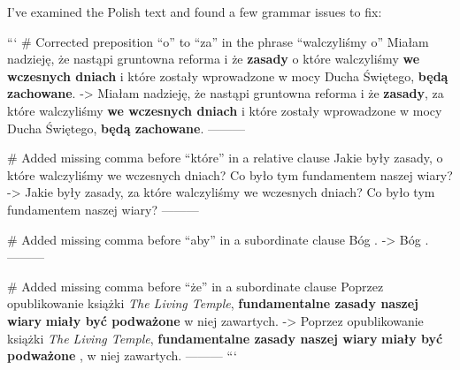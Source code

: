 I've examined the Polish text and found a few grammar issues to fix:

```
# Corrected preposition “o” to “za” in the phrase “walczyliśmy o”
Miałam nadzieję, że nastąpi gruntowna reforma i że \textbf{zasady} o które walczyliśmy \textbf{we wczesnych dniach} i które zostały wprowadzone w mocy Ducha Świętego, \textbf{będą zachowane}.
->
Miałam nadzieję, że nastąpi gruntowna reforma i że \textbf{zasady}, za które walczyliśmy \textbf{we wczesnych dniach} i które zostały wprowadzone w mocy Ducha Świętego, \textbf{będą zachowane}.
---------

# Added missing comma before “które” in a relative clause
Jakie były zasady, o które walczyliśmy we wczesnych dniach? Co było tym fundamentem naszej wiary?
->
Jakie były zasady, za które walczyliśmy we wczesnych dniach? Co było tym fundamentem naszej wiary?
---------

# Added missing comma before “aby” in a subordinate clause
Bóg .
->
Bóg .
---------

# Added missing comma before “że” in a subordinate clause
Poprzez opublikowanie książki \textit{The Living Temple}, \textbf{fundamentalne zasady naszej wiary} \textbf{miały być podważone}  w niej zawartych.
->
Poprzez opublikowanie książki \textit{The Living Temple}, \textbf{fundamentalne zasady naszej wiary} \textbf{miały być podważone} , w niej zawartych.
---------
```